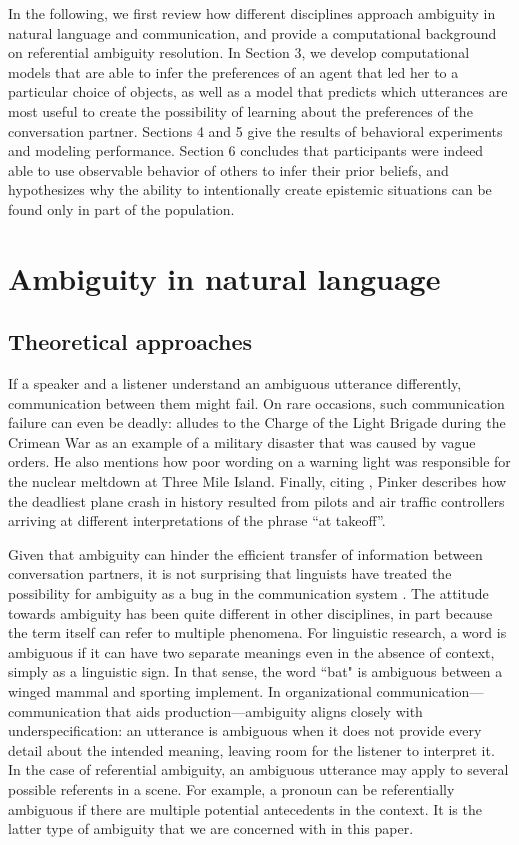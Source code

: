 \documentclass[10pt,a4paper]{article}
\begin{document}
In the following, we first review how different disciplines approach ambiguity in natural language and communication, and provide a computational background on referential ambiguity resolution. 
In Section 3, we develop computational models that are able to infer the preferences of an agent that led her to a particular choice of objects, as well as a model that predicts which utterances are most useful to create the possibility of learning about the preferences of the conversation partner. 
Sections 4 and 5 give the results of behavioral experiments and modeling performance. 
Section 6 concludes that participants were indeed able to use observable behavior of others to infer their prior beliefs, and hypothesizes why the ability to intentionally create epistemic situations can be found only in part of the population.


\section{Ambiguity in natural language}
\subsection{Theoretical approaches}

If a speaker and a listener understand an ambiguous utterance differently, communication between them might fail.
On rare occasions, such communication failure can even be deadly: 
 alludes to the Charge of the Light Brigade during the Crimean War as an example of a military disaster that was caused by vague orders.
He also mentions how poor wording on a warning light was responsible for the nuclear meltdown at Three Mile Island. Finally, citing , Pinker describes how the deadliest plane crash in history resulted from pilots and air traffic controllers arriving at different interpretations of the phrase ``at takeoff''.

Given that ambiguity can hinder the efficient transfer of information between conversation partners, it is not surprising that linguists have treated the possibility for ambiguity as a bug in the communication system \cite{grice1975,chomsky2002minimalism}. The attitude towards ambiguity has been quite different in other disciplines, in part because the term itself can refer to multiple phenomena. For linguistic research, a word is ambiguous if it can have two separate meanings even in the absence of context, simply as a linguistic sign. In that sense, the word ``bat" is ambiguous between a winged mammal and sporting implement. In organizational communication---communication that aids production---ambiguity aligns closely with underspecification: an utterance is ambiguous when it does not provide every detail about the intended meaning, leaving room for the listener to interpret it. In the case of referential ambiguity, an ambiguous utterance may apply to several possible referents in a scene. For example, a pronoun can be referentially ambiguous if there are multiple potential antecedents in the context. It is the latter type of ambiguity that we are concerned with in this paper.
\end{document}
